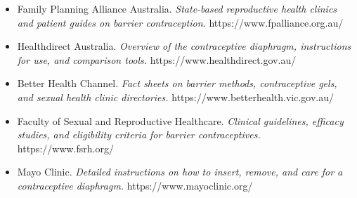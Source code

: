 \begin{itemize}
    \item Family Planning Alliance Australia. \textit{State-based reproductive health clinics and patient guides on barrier contraception.} https://www.fpalliance.org.au/
    \item Healthdirect Australia. \textit{Overview of the contraceptive diaphragm, instructions for use, and comparison tools.} https://www.healthdirect.gov.au/
    \item Better Health Channel. \textit{Fact sheets on barrier methods, contraceptive gels, and sexual health clinic directories.} https://www.betterhealth.vic.gov.au/
    \item Faculty of Sexual and Reproductive Healthcare. \textit{Clinical guidelines, efficacy studies, and eligibility criteria for barrier contraceptives.} https://www.fsrh.org/
    \item Mayo Clinic. \textit{Detailed instructions on how to insert, remove, and care for a contraceptive diaphragm.} https://www.mayoclinic.org/
\end{itemize}
